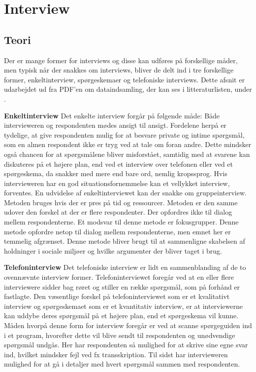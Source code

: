 \chapter{Interview}
\section{Teori}
Der er mange former for interviews og disse kan udføres på forskellige måder, men typisk når der snakkes om interviews, bliver de delt ind i tre forskellige former, enkeltinterview, spørgeskemaer og telefoniske interviews.
Dette afsnit er udarbejdet ud fra PDF'en om dataindsamling, der kan ses i litteraturlisten, under \citep{metodeogprojektskrivning}.\newline

\textbf{Enkeltinterview}\newline
Det enkelte interview forgår på følgende måde: Både intervieweren og respondenten mødes ansigt til ansigt. Fordelene herpå er tydelige, at give respondenten mulig for at besvare private og intime spørgsmål, som en almen respondent ikke er tryg ved at tale om foran andre. Dette mindsker også chancen for at spørgsmålene bliver misforstået, samtidig med at svarene kan diskuteres på et højere plan, end ved et interview over telefonen eller ved et spørgeskema, da snakker med mere end bare ord, nemlig kropssprog. Hvis intervieweren har en god situationsfornemmelse kan et vellykket interview, forventes. 
En udvidelse af enkeltinterviewet kan der snakke om gruppeinterview. Metoden bruges hvis der er pres på tid og ressourcer. Metoden er den samme udover den forskel at der er flere respondenter. Der opfordres ikke til dialog mellem respondenterne. Et modsvar til denne metode er fokusgrupper. Denne metode opfordre netop til dialog mellem respondenterne, men emnet her er temmelig afgrænset. Denne metode bliver brugt til at sammenligne skabelsen af holdninger i sociale miljøer og hvilke argumenter der bliver taget i brug. \newline

\textbf{Telefoninterview}\newline
Det telefoniske interview er lidt en sammenblanding af de to ovennævnte interview former. Telefoninterviewet foregår ved at en eller flere interviewere sidder bag røret og stiller en række spørgsmål, som på forhånd er fastlagte. Den væsentlige forskel på telefoninterviewet som er et kvalitativt interview og spørgeskemaet som er et kvantitativ interview, er at interviewerne kan uddybe deres spørgsmål på et højere plan, end et spørgeskema vil kunne. Måden hvorpå denne form for interview foregår er ved at scanne spørgeguiden ind i et program, hvorefter dette vil blive sendt til respondenten og unødvendige spørgsmål undgås. Her har respondenten så mulighed for at skrive sine egne svar ind, hvilket mindsker fejl ved fx transskription. Til sidst har intervieweren mulighed for at gå i detaljer med hvert spørgsmål sammen med respondenten.\newline

